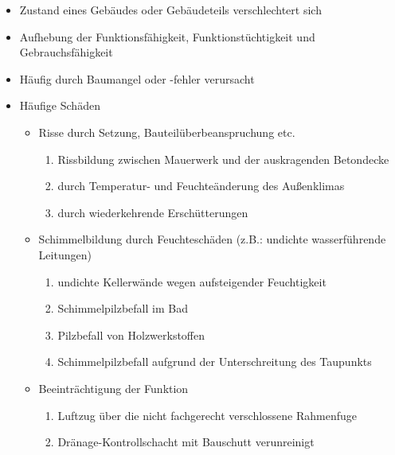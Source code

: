 \documentclass[fleqn,twoside,dvipsnames]{article}
\begin{document}
\begin{itemize}
\begin{itemize}
                    \item Zustand eines Gebäudes oder Gebäudeteils verschlechtert sich
                    \item Aufhebung der Funktionsfähigkeit, Funktionstüchtigkeit und Gebrauchsfähigkeit
                    \item Häufig durch Baumangel oder -fehler verursacht
                    \item Häufige Schäden
                        \begin{itemize}
                            \item Risse durch Setzung, Bauteilüberbeanspruchung etc.
                                \begin{enumerate}
                                    \item Rissbildung zwischen Mauerwerk und der auskragenden Betondecke
                                    \item durch Temperatur- und Feuchteänderung des Außenklimas
                                    \item durch wiederkehrende Erschütterungen
                                \end{enumerate}
                            \item Schimmelbildung durch Feuchteschäden (z.B.: undichte wasserführende Leitungen)
                                \begin{enumerate}
                                    \item undichte Kellerwände wegen aufsteigender Feuchtigkeit
                                    \item Schimmelpilzbefall im Bad
                                    \item Pilzbefall von Holzwerkstoffen
                                    \item Schimmelpilzbefall aufgrund der Unterschreitung des Taupunkts
                                \end{enumerate}
                            \item Beeinträchtigung der Funktion
                                \begin{enumerate}
                                    \item Luftzug über die nicht fachgerecht verschlossene Rahmenfuge
                                    \item Dränage-Kontrollschacht mit Bauschutt verunreinigt
                                \end{enumerate}

\end{itemize}
\end{itemize}
\end{itemize}
\end{document}

